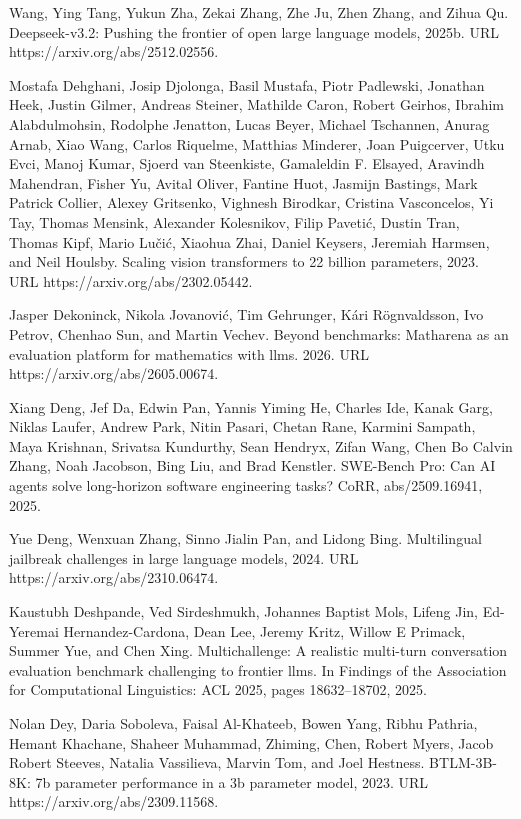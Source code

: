 Wang, Ying Tang, Yukun Zha, Zekai Zhang, Zhe Ju, Zhen Zhang, and Zihua
Qu. Deepseek-v3.2: Pushing the frontier of open large language models,
2025b. URL https://arxiv.org/abs/2512.02556.

Mostafa Dehghani, Josip Djolonga, Basil Mustafa, Piotr Padlewski,
Jonathan Heek, Justin Gilmer, Andreas Steiner, Mathilde Caron, Robert
Geirhos, Ibrahim Alabdulmohsin, Rodolphe Jenatton, Lucas Beyer, Michael
Tschannen, Anurag Arnab, Xiao Wang, Carlos Riquelme, Matthias Minderer,
Joan Puigcerver, Utku Evci, Manoj Kumar, Sjoerd van Steenkiste,
Gamaleldin F. Elsayed, Aravindh Mahendran, Fisher Yu, Avital Oliver,
Fantine Huot, Jasmijn Bastings, Mark Patrick Collier, Alexey Gritsenko,
Vighnesh Birodkar, Cristina Vasconcelos, Yi Tay, Thomas Mensink,
Alexander Kolesnikov, Filip Pavetić, Dustin Tran, Thomas Kipf, Mario
Lučić, Xiaohua Zhai, Daniel Keysers, Jeremiah Harmsen, and Neil Houlsby.
Scaling vision transformers to 22 billion parameters, 2023. URL
https://arxiv.org/abs/2302.05442.

Jasper Dekoninck, Nikola Jovanović, Tim Gehrunger, Kári Rögnvaldsson,
Ivo Petrov, Chenhao Sun, and Martin Vechev. Beyond benchmarks: Matharena
as an evaluation platform for mathematics with llms. 2026. URL
https://arxiv.org/abs/2605.00674.

Xiang Deng, Jef Da, Edwin Pan, Yannis Yiming He, Charles Ide, Kanak
Garg, Niklas Laufer, Andrew Park, Nitin Pasari, Chetan Rane, Karmini
Sampath, Maya Krishnan, Srivatsa Kundurthy, Sean Hendryx, Zifan Wang,
Chen Bo Calvin Zhang, Noah Jacobson, Bing Liu, and Brad Kenstler.
SWE-Bench Pro: Can AI agents solve long-horizon software engineering
tasks? CoRR, abs/2509.16941, 2025.

Yue Deng, Wenxuan Zhang, Sinno Jialin Pan, and Lidong Bing. Multilingual
jailbreak challenges in large language models, 2024. URL
https://arxiv.org/abs/2310.06474.

Kaustubh Deshpande, Ved Sirdeshmukh, Johannes Baptist Mols, Lifeng Jin,
Ed-Yeremai Hernandez-Cardona, Dean Lee, Jeremy Kritz, Willow E Primack,
Summer Yue, and Chen Xing. Multichallenge: A realistic multi-turn
conversation evaluation benchmark challenging to frontier llms. In
Findings of the Association for Computational Linguistics: ACL 2025, pages
18632--18702, 2025.

Nolan Dey, Daria Soboleva, Faisal Al-Khateeb, Bowen Yang, Ribhu Pathria,
Hemant Khachane, Shaheer Muhammad, Zhiming, Chen, Robert Myers, Jacob
Robert Steeves, Natalia Vassilieva, Marvin Tom, and Joel Hestness.
BTLM-3B-8K: 7b parameter performance in a 3b parameter model, 2023. URL
https://arxiv.org/abs/2309.11568.

